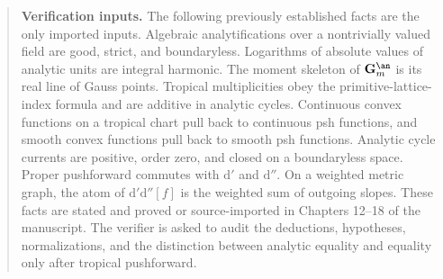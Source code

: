 \begin{quote}
\textbf{Verification inputs.}
The following previously established facts are the only imported inputs.
Algebraic analytifications over a nontrivially valued field are good,
strict, and boundaryless.  Logarithms of absolute values of analytic units
are integral harmonic.  The moment skeleton of
$\mathbf G_m^{\an}$ is its real line of Gauss points.  Tropical
multiplicities obey the primitive-lattice-index formula and are additive in
analytic cycles.  Continuous convex functions on a tropical chart pull
back to continuous psh functions, and smooth convex functions pull back to
smooth psh functions.  Analytic cycle currents are positive, order zero,
and closed on a boundaryless space.  Proper pushforward commutes with
$\mathrm d'$ and $\mathrm d''$.  On a weighted metric graph, the atom of
$\mathrm d'\mathrm d''[f]$ is the weighted sum of outgoing slopes.  These
facts are stated and proved or source-imported in Chapters 12--18 of the
manuscript.  The verifier is asked to audit the deductions, hypotheses,
normalizations, and the distinction between analytic equality and equality
only after tropical pushforward.
\end{quote}
